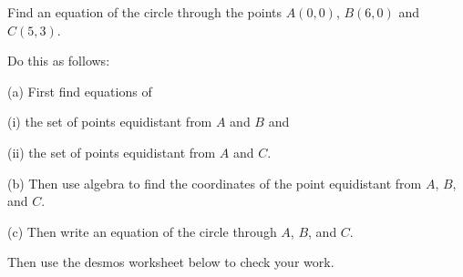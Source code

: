 \documentclass{ximera}
\begin{document}
\begin{question}  \label{Q983g4332}
Find an equation of the circle through the points $A(0,0)$, $B(6,0)$ and $C(5,3)$.  

\begin{hint}
Do this as follows:

(a) First find equations of 

(i) the set of points equidistant from $A$ and $B$ and

(ii) the set of points equidistant from $A$ and $C$.

(b) Then use algebra to find the coordinates of the point equidistant from $A$, $B$, and $C$.

(c) Then write an equation of the circle through $A$, $B$, and $C$.

\end{hint}

Then use the desmos worksheet below to check your work.

\begin{onlineOnly}
    \begin{center}
\end{center}
\end{onlineOnly}

\end{question}
\end{document}
